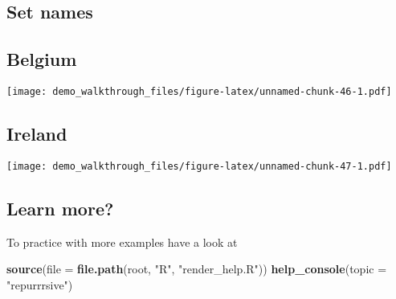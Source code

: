 \documentclass[]{article}
\newenvironment{Shaded}{\begin{snugshade}}{\end{snugshade}}
\newcommand{\KeywordTok}[1]{\textcolor[rgb]{0.13,0.29,0.53}{\textbf{#1}}}
\newcommand{\DataTypeTok}[1]{\textcolor[rgb]{0.13,0.29,0.53}{#1}}
\newcommand{\StringTok}[1]{\textcolor[rgb]{0.31,0.60,0.02}{#1}}
\newcommand{\OperatorTok}[1]{\textcolor[rgb]{0.81,0.36,0.00}{\textbf{#1}}}
\newcommand{\NormalTok}[1]{#1}
\begin{document}
\subsection{Set names}\label{set-names}

\begin{Shaded}
\end{Shaded}

\subsection{Belgium}\label{belgium}

\texttt{[image: demo\_walkthrough\_files/figure-latex/unnamed-chunk-46-1.pdf]}

\subsection{Ireland}\label{ireland}

\texttt{[image: demo\_walkthrough\_files/figure-latex/unnamed-chunk-47-1.pdf]}

\subsection{Learn more?}\label{learn-more-1}

To practice with more examples have a look at

\begin{Shaded}
\begin{Highlighting}[]
\KeywordTok{source}\NormalTok{(}\DataTypeTok{file =} \KeywordTok{file.path}\NormalTok{(root, }\StringTok{"R"}\NormalTok{, }\StringTok{"render_help.R"}\NormalTok{))}
\KeywordTok{help_console}\NormalTok{(}\DataTypeTok{topic =} \StringTok{"repurrrsive"}\NormalTok{)}
\end{Highlighting}
\end{Shaded}
\end{document}
